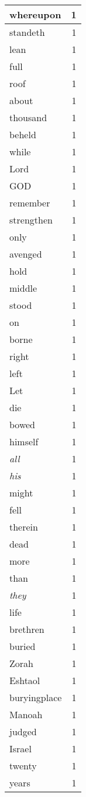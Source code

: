 \begin{center}
\begin{longtable}{l|r}
whereupon & 1\\ \hline 
standeth & 1\\ \hline 
lean & 1\\ \hline 
full & 1\\ \hline 
roof & 1\\ \hline 
about & 1\\ \hline 
thousand & 1\\ \hline 
beheld & 1\\ \hline 
while & 1\\ \hline 
Lord & 1\\ \hline 
GOD & 1\\ \hline 
remember & 1\\ \hline 
strengthen & 1\\ \hline 
only & 1\\ \hline 
avenged & 1\\ \hline 
hold & 1\\ \hline 
middle & 1\\ \hline 
stood & 1\\ \hline 
on & 1\\ \hline 
borne & 1\\ \hline 
right & 1\\ \hline 
left & 1\\ \hline 
Let & 1\\ \hline 
die & 1\\ \hline 
bowed & 1\\ \hline 
himself & 1\\ \hline 
\emph{all} & 1\\ \hline 
\emph{his} & 1\\ \hline 
might & 1\\ \hline 
fell & 1\\ \hline 
therein & 1\\ \hline 
dead & 1\\ \hline 
more & 1\\ \hline 
than & 1\\ \hline 
\emph{they} & 1\\ \hline 
life & 1\\ \hline 
brethren & 1\\ \hline 
buried & 1\\ \hline 
Zorah & 1\\ \hline 
Eshtaol & 1\\ \hline 
buryingplace & 1\\ \hline 
Manoah & 1\\ \hline 
judged & 1\\ \hline 
Israel & 1\\ \hline 
twenty & 1\\ \hline 
years & 1\\ \hline 
\end{longtable}
\end{center}



